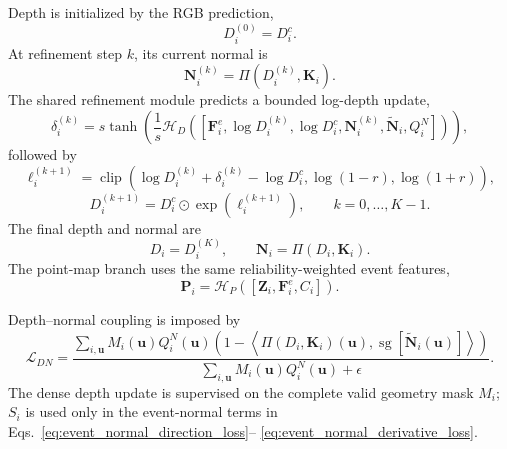 Depth is initialized by the RGB prediction,
\begin{equation}
    D_i^{(0)}=D_i^{c}.
    \label{eq:depth_initialization}
\end{equation}
At refinement step $k$, its current normal is
\begin{equation}
    \bm N_i^{(k)}=\Pi(D_i^{(k)},\bm K_i).
    \label{eq:iterative_current_normal}
\end{equation}
The shared refinement module predicts a bounded log-depth update,
\begin{equation}
    \delta_i^{(k)}=
    s\tanh\!\left(
    \frac{1}{s}\mathcal{H}_{D}
    ([\bm F_i^{e},\log D_i^{(k)},\log D_i^{c},
      \bm N_i^{(k)},\widetilde{\bm N}_i,Q_i^{N}])
    \right),
    \label{eq:iterative_depth_update}
\end{equation}
followed by
\begin{equation}
    \ell_i^{(k+1)}=
    \operatorname{clip}\!\left(
    \log D_i^{(k)}+\delta_i^{(k)}-\log D_i^{c},
    \log(1-r),\log(1+r)\right),
    \label{eq:bounded_log_ratio}
\end{equation}
\begin{equation}
    D_i^{(k+1)}=D_i^{c}\odot\exp(\ell_i^{(k+1)}),
    \qquad k=0,\ldots,K-1.
    \label{eq:depth_refinement_iteration}
\end{equation}
The final depth and normal are
\begin{equation}
    D_i=D_i^{(K)},
    \qquad
    \bm N_i=\Pi(D_i,\bm K_i).
    \label{eq:final_depth_normal}
\end{equation}
The point-map branch uses the same reliability-weighted event features,
\begin{equation}
    \bm P_i=
    \mathcal{H}_{P}([\bm Z_i,\bm F_i^{e},C_i]).
    \label{eq:point_map_refinement}
\end{equation}

Depth--normal coupling is imposed by
\begin{equation}
    \mathcal{L}_{DN}=
    \frac{\sum_{i,\bm u}M_i(\bm u)Q_i^{N}(\bm u)
    \left(1-\left\langle
    \Pi(D_i,\bm K_i)(\bm u),
    \operatorname{sg}[\widetilde{\bm N}_i(\bm u)]
    \right\rangle\right)}
    {\sum_{i,\bm u}M_i(\bm u)Q_i^{N}(\bm u)+\epsilon}.
    \label{eq:depth_normal_consistency}
\end{equation}
The dense depth update is supervised on the complete valid geometry mask
$M_i$; $S_i$ is used only in the event-normal terms in
Eqs.~\eqref{eq:event_normal_direction_loss}--
\eqref{eq:event_normal_derivative_loss}.


